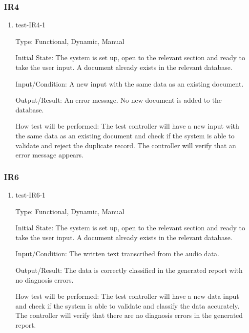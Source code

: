 \documentclass[12pt, titlepage]{article}
\begin{document}
  \subsubsection{IR4}
    
  \begin{enumerate}

    \item{test-IR4-1} \label{test-IR4-1} %
    
    Type: Functional, Dynamic, Manual
    
    Initial State: The system is set up, open to the relevant section and ready to take the user input. A document already exists in the relevant database.
    
    Input/Condition: A new input with the same data as an existing document.
    
    Output/Result: An error message. No new document is added to the database.
    
    How test will be performed: The test controller will have a new input with the same data as an existing document and check if the system is able to validate and reject the duplicate record. The controller will verify that an error message appears.

  \end{enumerate}

  \subsubsection{IR6}
    
  \begin{enumerate}

    \item{test-IR6-1} \label{test-IR6-1} %
    
    Type: Functional, Dynamic, Manual
    
    Initial State: The system is set up, open to the relevant section and ready to take the user input. A document already exists in the relevant database.
    
    Input/Condition: The written text transcribed from the audio data.
    
    Output/Result: The data is correctly classified in the generated report with no diagnosis errors.
    
    How test will be performed: The test controller will have a new data input and check if the system is able to validate and classify the data accurately. The controller will verify that there are no diagnosis errors in the generated report.

  \end{enumerate}
\end{document}
